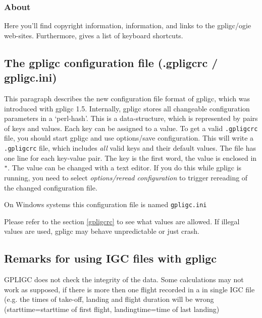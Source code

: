 


\subsubsection{About}
Here you'll find copyright information, information, and links to the gpligc/ogie web-sites.
Furthermore,  gives a list of keyboard shortcuts.


\subsection{The gpligc configuration file (.gpligcrc / gpligc.ini)}
This paragraph describes the new configuration file format of gpligc, which was introduced with gpligc 1.5.
Internally, gpligc stores all changeable configuration parameters in a `perl-hash'.
This is a data-structure, which is represented by pairs of keys and values.
Each key can be assigned to a value.
To get a valid \texttt{.gpligcrc} file, you should start gpligc and use options/save configuration.
This will write a \texttt{.gpligcrc} file, which includes \emph{all} valid keys and their default values.
The file has one line for each key-value pair.
The key is the first word, the value is enclosed in \texttt{"}.
The value can be changed with a text editor.
If you do this while gpligc is running, you need to select \emph{options/reread configuration} to trigger rereading of the changed configuration file.

On Windows systems this configuration file is named \texttt{gpligc.ini}

Please refer to the section \ref{gpligcrc} to see what values are allowed.
If illegal values are used, gpligc may behave unpredictable or just crash.



\subsection{Remarks for using IGC files with gpligc}
GPLIGC does not check the integrity of the data.
Some calculations may not work as supposed, if there is more then one flight recorded in a in single IGC file
(e.g. the times of take-off, landing and flight duration will be wrong (starttime=starttime of first flight, landingtime=time of last landing)
